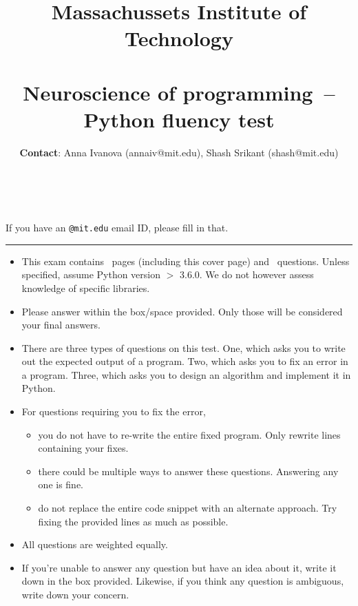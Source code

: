 \documentclass[letterpaper,12pt,addpoints]{exam}
\newcommand{\university}{Massachussets Institute of Technology}
\newcommand{\faculty}{~}
\newcommand{\class}{Neuroscience of programming~}
\newcommand{\examnum}{Python fluency test}
\newcommand{\examdate}{~}
\begin{document}
	
	\title{\Large \textbf{\university\\ \faculty\\
			\bigskip
			\class -- \examnum \\ }}
	\author{\textbf{Contact}: Anna Ivanova (annaiv@mit.edu), Shash Srikant (shash@mit.edu)}
	\date{\examdate}
	\maketitle
	\begin{flushleft}
		\medskip \medskip
		\newline \newline
		\makebox[12cm]{\textbf{E-mail ID}:\ \hrulefill}
		\newline *If you have an \texttt{@mit.edu} email ID, please fill in that.
	\end{flushleft}
	\noindent \rule{\textwidth}{1pt}
	
	\begin{itemize}
		\item This exam contains \numpages\ pages (including this cover page) and \numquestions\ questions. Unless specified, assume Python version $>$ 3.6.0. We do not however assess knowledge of specific libraries.
        \item Please answer within the box/space provided. Only those will be considered your final answers.
		\item There are three types of questions on this test. One, which asks you to write out the expected output of a program. Two, which asks you to fix an error in a program. Three, which asks you to design an algorithm and implement it in Python.
		\item For questions requiring you to fix the error, 
        \begin{itemize}
            \item you do not have to re-write the entire fixed program. Only rewrite lines containing your fixes. 
            \item there could be multiple ways to answer these questions. Answering any one is fine.
            \item do not replace the entire code snippet with an alternate approach. Try fixing the provided lines as much as possible.
        \end{itemize}
		\item All questions are weighted equally.
        \item If you're unable to answer any question but have an idea about it, write it down in the box provided. 
Likewise, if you think any question is ambiguous, write down your concern.
	\end{itemize}
\end{document}

